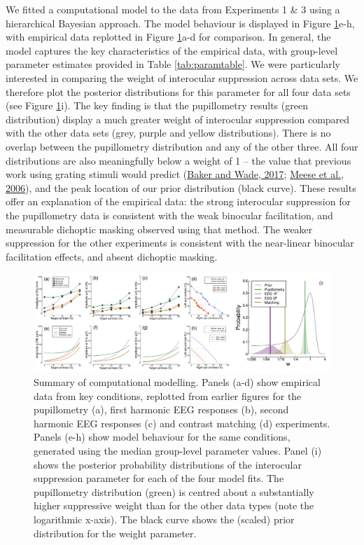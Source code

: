 \documentclass[
]{article}
\begin{document}
We fitted a computational model to the data from Experiments 1 \& 3 using a hierarchical Bayesian approach. The model behaviour is displayed in Figure \ref{fig:modelfigure}e-h, with empirical data replotted in Figure \ref{fig:modelfigure}a-d for comparison. In general, the model captures the key characteristics of the empirical data, with group-level parameter estimates provided in Table \ref{tab:paramtable}. We were particularly interested in comparing the weight of interocular suppression across data sets. We therefore plot the posterior distributions for this parameter for all four data sets (see Figure \ref{fig:modelfigure}i). The key finding is that the pupillometry results (green distribution) display a much greater weight of interocular suppression compared with the other data sets (grey, purple and yellow distributions). There is no overlap between the pupillometry distribution and any of the other three. All four distributions are also meaningfully below a weight of 1 -- the value that previous work using grating stimuli would predict (\protect\hyperlink{ref-Baker2017}{Baker and Wade, 2017}; \protect\hyperlink{ref-Meese2006}{Meese et al., 2006}), and the peak location of our prior distribution (black curve). These results offer an explanation of the empirical data: the strong interocular suppression for the pupillometry data is consistent with the weak binocular facilitation, and measurable dichoptic masking observed using that method. The weaker suppression for the other experiments is consistent with the near-linear binocular facilitation effects, and absent dichoptic masking.

\begin{figure}

{\centering \includegraphics{Figures/modelfigure} 

}

\caption{Summary of computational modelling. Panels (a-d) show empirical data from key conditions, replotted from earlier figures for the pupillometry (a), first harmonic EEG responses (b), second harmonic EEG responses (c) and contrast matching (d) experiments. Panels (e-h) show model behaviour for the same conditions, generated using the median group-level parameter values.  Panel (i) shows the posterior probability distributions of the interocular suppression parameter for each of the four model fits. The pupillometry distribution (green) is centred about a substantially higher suppressive weight than for the other data types (note the logarithmic x-axis). The black curve shows the (scaled) prior distribution for the weight parameter.}\label{fig:modelfigure}
\end{figure}
\end{document}
